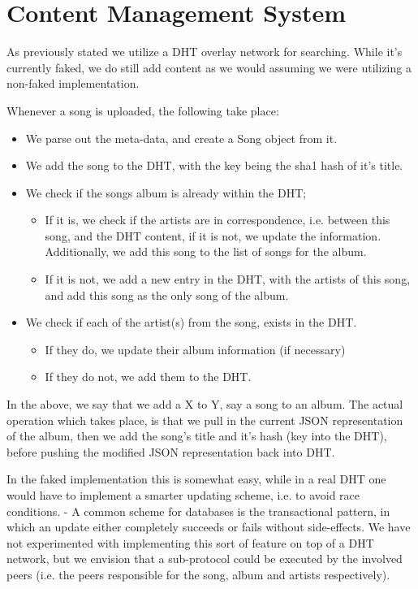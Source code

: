 \section{Content Management System}
As previously stated we utilize a \acs{DHT} overlay network for searching. While it's
currently faked, we do still add content as we would assuming we were utilizing
a non-faked implementation.

Whenever a song is uploaded, the following take place:
\begin{itemize}
\item We parse out the meta-data, and create a Song object from it.
\item We add the song to the \acs{DHT}, with the key being the sha1 hash of it's title.
\item We check if the songs album is already within the \acs{DHT};
\begin{itemize}
\item If it is, we check if the artists are in correspondence, i.e. between
    this song, and the \acs{DHT} content, if it is not, we update the information.
    Additionally, we add this song to the list of songs for the album.
\item If it is not, we add a new entry in the \acs{DHT}, with the artists of this
    song, and add this song as the only song of the album.
\end{itemize}
\item We check if each of the artist(s) from the song, exists in the \acs{DHT}.
\begin{itemize}
\item If they do, we update their album information (if necessary)
\item If they do not, we add them to the \acs{DHT}.
\end{itemize}
\end{itemize}
In the above, we say that we add a X to Y, say a song to an album. The actual 
operation which takes place, is that we pull in the current \acs{JSON} representation
of the album, then we add the song's title and it's hash (key into the \acs{DHT}),
before pushing the modified \acs{JSON} representation back into \acs{DHT}.

In the faked implementation this is somewhat easy, while in a real \acs{DHT} one
would have to implement a smarter updating scheme, i.e. to avoid race conditions.
\newline
- A common scheme for databases is the transactional pattern, in which an update
either completely succeeds or fails without side-effects. We have not experimented
with implementing this sort of feature on top of a \acs{DHT} network, but we envision
that a sub-protocol could be executed by the involved peers (i.e. the peers
responsible for the song, album and artists respectively).

